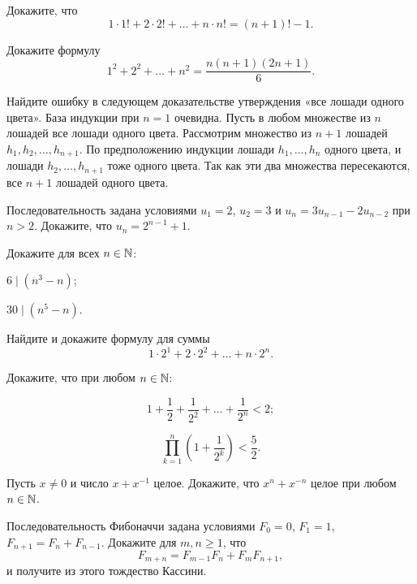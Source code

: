 

\def\SheetNo{1}




\begin{problems}

\item Докажите, что
\[
1\cdot 1!+2\cdot 2!+\ldots+n\cdot n!=(n+1)!-1.
\]

\item Докажите формулу
\[
1^2+2^2+\ldots+n^2=\frac{n(n+1)(2n+1)}{6}.
\]

\item Найдите ошибку в следующем доказательстве утверждения «все лошади одного цвета». База индукции при $n=1$ очевидна. Пусть в любом множестве из $n$ лошадей все лошади одного цвета. Рассмотрим множество из $n+1$ лошадей $h_1,h_2,\ldots,h_{n+1}$. По предположению индукции лошади $h_1,\ldots,h_n$ одного цвета, и лошади $h_2,\ldots,h_{n+1}$ тоже одного цвета. Так как эти два множества пересекаются, все $n+1$ лошадей одного цвета.

\item Последовательность задана условиями $u_1=2$, $u_2=3$ и $u_n=3u_{n-1}-2u_{n-2}$ при $n>2$. Докажите, что $u_n=2^{n-1}+1$.

\item Докажите для всех $n\in\mathbb{N}$:
\begin{parts}
  \item $6\mid(n^3-n)$;
  \item $30\mid(n^5-n)$.
\end{parts}

\item Найдите и докажите формулу для суммы
\[
1\cdot 2^1+2\cdot 2^2+\ldots+n\cdot 2^n.
\]

\item Докажите, что при любом $n\in\mathbb{N}$:
\begin{parts}
  \item
  \[
  1+\frac12+\frac1{2^2}+\ldots+\frac1{2^n}<2;
  \]
  \item
  \[
  \prod_{k=1}^{n}\left(1+\frac1{2^k}\right)<\frac52.
  \]
\end{parts}

\item Пусть $x\ne0$ и число $x+x^{-1}$ целое. Докажите, что $x^n+x^{-n}$ целое при любом $n\in\mathbb{N}$.

\item Последовательность Фибоначчи задана условиями $F_0=0$, $F_1=1$, $F_{n+1}=F_n+F_{n-1}$. Докажите для $m,n\geqslant1$, что
\[
F_{m+n}=F_{m-1}F_n+F_mF_{n+1},
\]
и получите из этого тождество Кассини.


\end{problems}
